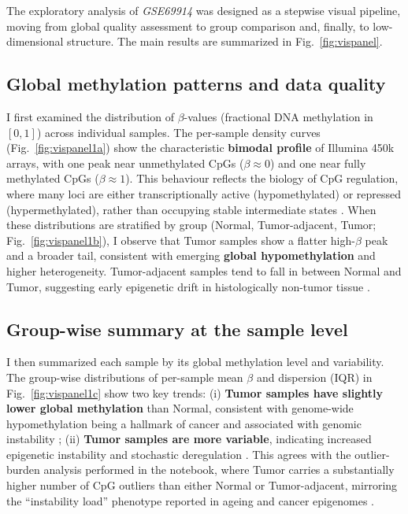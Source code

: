 \documentclass[10pt]{extarticle}
\begin{document}
The exploratory analysis of \textit{GSE69914} was designed as a stepwise visual pipeline, moving from global quality assessment to group comparison and, finally, to low-dimensional structure. The main results are summarized in Fig.~\ref{fig:vispanel}.

\subsection{Global methylation patterns and data quality}
I first examined the distribution of $\beta$-values (fractional DNA methylation in $[0,1]$) across individual samples.  
The per-sample density curves (Fig.~\ref{fig:vispanel1a}) show the characteristic \textbf{bimodal profile} of Illumina 450k arrays, with one peak near unmethylated CpGs ($\beta \approx 0$) and one near fully methylated CpGs ($\beta \approx 1$).  
This behaviour reflects the biology of CpG regulation, where many loci are either transcriptionally active (hypomethylated) or repressed (hypermethylated), rather than occupying stable intermediate states \cite{ref8,ref11}.  
When these distributions are stratified by group (Normal, Tumor-adjacent, Tumor; Fig.~\ref{fig:vispanel1b}), I observe that Tumor samples show a flatter high-$\beta$ peak and a broader tail, consistent with emerging \textbf{global hypomethylation} and higher heterogeneity.  
Tumor-adjacent samples tend to fall in between Normal and Tumor, suggesting early epigenetic drift in histologically non-tumor tissue \cite{ref12}.

\subsection{Group-wise summary at the sample level}
I then summarized each sample by its global methylation level and variability.  
The group-wise distributions of per-sample mean $\beta$ and dispersion (IQR) in Fig.~\ref{fig:vispanel1c} show two key trends:  
(i) \textbf{Tumor samples have slightly lower global methylation} than Normal, consistent with genome-wide hypomethylation being a hallmark of cancer and associated with genomic instability \cite{ref8};  
(ii) \textbf{Tumor samples are more variable}, indicating increased epigenetic instability and stochastic deregulation \cite{ref13}.  
This agrees with the outlier-burden analysis performed in the notebook, where Tumor carries a substantially higher number of CpG outliers than either Normal or Tumor-adjacent, mirroring the “instability load” phenotype reported in ageing and cancer epigenomes \cite{ref13}.
\end{document}
